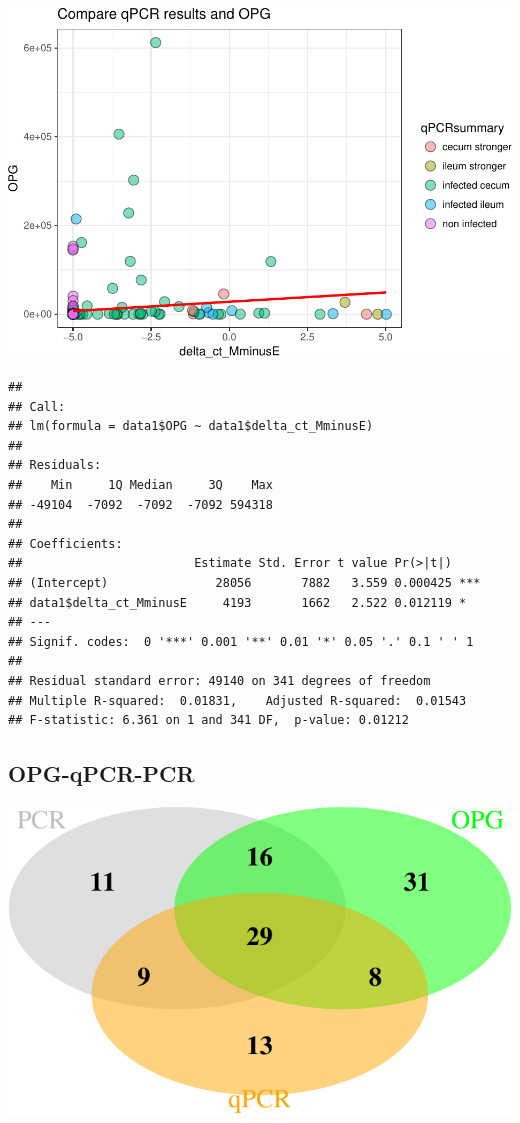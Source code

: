\documentclass[]{article}
\let\origfigure\figure
\let\endorigfigure\endfigure
\renewenvironment{figure}[1][2] { 
    \expandafter\origfigure\expandafter[H] 
} { 
    \endorigfigure 
}
\begin{document}
\includegraphics{Data_Analysis_Alice_files/figure-latex/opgqpcr-1.pdf}

\begin{verbatim}
## 
## Call:
## lm(formula = data1$OPG ~ data1$delta_ct_MminusE)
## 
## Residuals:
##    Min     1Q Median     3Q    Max 
## -49104  -7092  -7092  -7092 594318 
## 
## Coefficients:
##                        Estimate Std. Error t value Pr(>|t|)    
## (Intercept)               28056       7882   3.559 0.000425 ***
## data1$delta_ct_MminusE     4193       1662   2.522 0.012119 *  
## ---
## Signif. codes:  0 '***' 0.001 '**' 0.01 '*' 0.05 '.' 0.1 ' ' 1
## 
## Residual standard error: 49140 on 341 degrees of freedom
## Multiple R-squared:  0.01831,    Adjusted R-squared:  0.01543 
## F-statistic: 6.361 on 1 and 341 DF,  p-value: 0.01212
\end{verbatim}

\subsection{OPG-qPCR-PCR}\label{opg-qpcr-pcr}

\begin{figure}[htbp]
\centering
\includegraphics{Data_Analysis_Alice_files/figure-latex/venn2-1.pdf}
\caption{\label{fig:venn1}Comparison of detection: PCR vs flotation vs
qPCŔ}
\end{figure}
\end{document}

